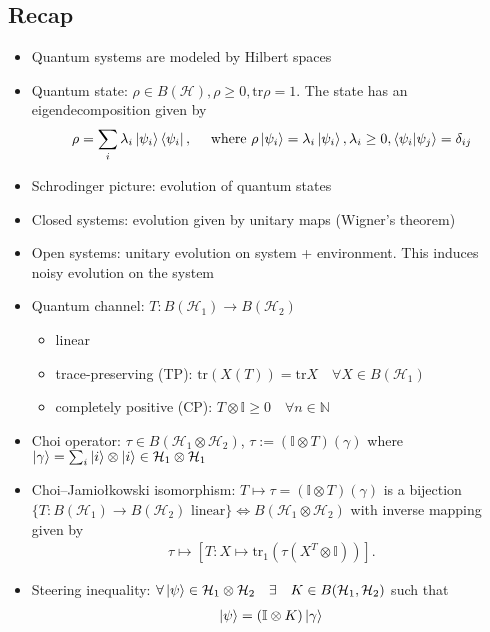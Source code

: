 \documentclass[../../note.tex]{subfiles}
\begin{document}
\subsection{Recap}
\begin{itemize}
    \item Quantum systems are modeled by Hilbert spaces
    \item Quantum state: $\rho \in B(\mathcal{H}), \rho \geq 0, \text{tr}\rho =1$. The state has an eigendecomposition given by
    \begin{align}
        \rho=\sum_i \lambda_i \ket{\psi_i}\bra{\psi_i}, \quad \text{ where } \rho \ket{\psi_i}=\lambda_i \ket{\psi_i}, \lambda_i \geq 0, \braket{\psi_i|\psi_j}=\delta_{ij}
    \end{align}
    \item Schrodinger picture: evolution of quantum states
    \item Closed systems: evolution given by unitary maps (Wigner's theorem)
    \item Open systems: unitary evolution on system + environment. This induces noisy evolution on the system
    \item Quantum channel: $T:B(\mathcal{H}_1)\rightarrow B(\mathcal{H}_2)$
    \begin{itemize}
        \item linear
        \item trace-preserving (TP): $\text{tr}(X(T)) =\text{tr}X \quad \forall X\in B(\mathcal{H}_1)$
        \item completely positive (CP): $T \otimes \mathbb{I} \geq 0 \quad \forall n\in \mathbb{N}$
    \end{itemize}
    \item Choi operator: $\tau \in B(\mathcal{H}_1\otimes \mathcal{H}_2)$, $\tau:=(\mathbb{I}\otimes T)(\gamma)$ where $\ket{\gamma} = \sum_i \ket{i} \otimes \ket{i}\in \mathcal{H}_1 \otimes \mathcal{H}_1$
    \item Choi–Jamiołkowski isomorphism: $T \mapsto \tau=(\mathbb{I}\otimes T)(\gamma)$ is a bijection $\{T:B(\mathcal{H}_1)\rightarrow B(\mathcal{H}_2) \text{ linear}\} \Leftrightarrow B(\mathcal{H}_1 \otimes \mathcal{H}_2)$ with inverse mapping given by \begin{align}
        \tau \mapsto \left[T: X \mapsto \text{tr}_1(\tau(X^T \otimes \mathbb{I}))\right].
    \end{align} 
    \item Steering inequality: $\forall \ket{\psi} \in \mathcal{H}_1 \otimes \mathcal{H}_2 \quad \exists \quad K \in B(\mathcal{H}_1, \mathcal{H}_2)$ such that 
    \begin{align}
        \ket{\psi} = (\mathbb{I} \otimes K) \ket{\gamma}
    \end{align}
\end{itemize}
\end{document}
